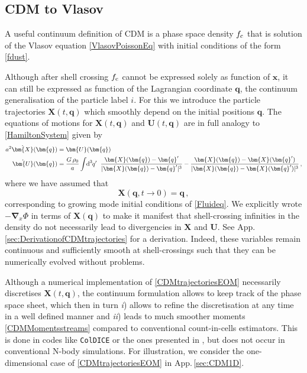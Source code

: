\documentclass[twocolumn, nofootinbib, showpacs, superscriptaddress]{revtex4-1}
\newcommand{\vol}[2]{\hspace{-0.8mm}\mbox{$\text{d}^{\hspace{-0.0mm}#1}$}\hspace{-0.2mm}#2\hspace{0.8mm}\ }
\newcommand{\vx}[0]{\bm{x} }
\newcommand{\vX}[0]{\bm{X} }
\newcommand{\vq}[0]{\bm{q} }
\newcommand{\vU}[0]{\bm{U} }
\newcommand{\vnabla}[0]{\bm{\nabla} }
\begin{document}
\subsection{CDM to Vlasov}\label{sec:CDMtoVlasov}
A useful continuum definition of CDM is a phase space density $f_{\rm c}$ that is solution  of the Vlasov equation \eqref{VlasovPoissonEq} with initial conditions of the form \eqref{fdust}. 

Although after shell crossing $f_{\rm c}$ cannot be expressed solely as function of $\vx$, it can still be expressed as function of the Lagrangian coordinate $\vq$, the continuum generalisation of the particle label $i$. 
For this we introduce the particle trajectories $\vX(t,\vq)$ which smoothly depend on the initial positions $\vq$. The equations of motions for $\vX(t,\vq)$ and $\vU(t,\vq)$ are in full analogy to \eqref{HamiltonSystem} given by
\begin{align} \label{CDMtrajectoriesEOM}
a^2 \dot{\vX}(\vq) &= \vU(\vq) \\
\dot{\vU}(\vq)& =  \frac{G\,\rho_0}{a}\int \vol{3}{q'}  \frac{\vX(\vq) - \vq'}{|\vX(\vq) - \vq'|^3}- \frac{\vX(\vq) -\vX(\vq')}{|\vX(\vq)- \vX(\vq')|^3}\,, \notag
 \end{align}
 where we have assumed that 
 \begin{equation} \label{CDMInitialX}
 \vX(\vq,t\rightarrow 0) = \vq\,,
 \end{equation}
  corresponding to growing mode initial conditions of \eqref{Fluideq}.
  We explicitly wrote $-\vnabla_{\!\!x} \varPhi$ in terms of $\vX(\vq)$ to make it manifest that  
shell-crossing infinities in the density do not necessarily lead to divergencies in $\vX$ and $\vU$. See App.\,\ref{sec:DerivationofCDMtrajectories} for a derivation.
Indeed, these variables remain continuous and sufficiently smooth at shell-crossings such that they can be numerically evolved without problems.

Although a numerical implementation of \eqref{CDMtrajectoriesEOM} necessarily discretises $\vX(t,\vq)$, the continuum formulation allows
 to keep track of the phase space sheet, which then in turn  {\it i}) allows to refine the discretisation at any time in a well 
defined manner and {\it ii}) leads to much smoother moments \eqref{CDMMomentsstreams} compared to conventional count-in-cells estimators.
 This is done in codes like \texttt{ColDICE} \cite{SousbieColombi2016} or the ones presented in \cite{ShandarinHabibHeitmann2012,AbelHahnKaehler2012,HahnAnguloAbel2015, HahnAngulo2016}, but does not occur in conventional N-body simulations.
 For illustration, we consider the one-dimensional case of \eqref{CDMtrajectoriesEOM} in App.\,\ref{sec:CDM1D}. 
\end{document}
